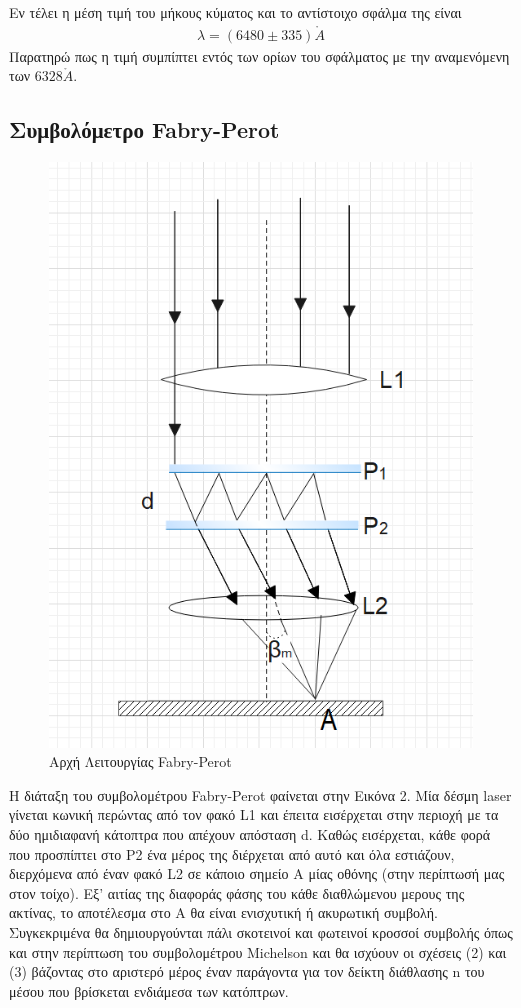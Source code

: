 \documentclass[a4paper]{article}
\begin{document}
Εν τέλει η μέση τιμή του μήκους κύματος και το αντίστοιχο σφάλμα της είναι
\begin{align*}
\lambda = ( 6480\pm 335) \mathring{A}
\end{align*}
Παρατηρώ πως η τιμή συμπίπτει εντός των ορίων του σφάλματος με την αναμενόμενη των $6328\mathring{A}$.


\subsection*{Συμβολόμετρο Fabry-Perot}

\begin{figure}
\includegraphics[width=0.7\linewidth]{fabry.png} 
\caption{ Αρχή Λειτουργίας Fabry-Perot}
\label{fig:wrapfig}
\end{figure}

Η διάταξη του συμβολομέτρου Fabry-Perot	 φαίνεται στην Εικόνα 2.
 Μία δέσμη laser γίνεται κωνική περώντας από τον φακό L1 και έπειτα εισέρχεται στην περιοχή με τα δύο ημιδιαφανή κάτοπτρα που απέχουν απόσταση d. Καθώς εισέρχεται, κάθε φορά που προσπίπτει στο Ρ2 ένα μέρος της διέρχεται από αυτό και όλα εστιάζουν, διερχόμενα από έναν φακό L2 σε κάποιο σημείο Α μίας οθόνης (στην περίπτωσή μας στον τοίχο).
Εξ' αιτίας της διαφοράς φάσης του κάθε διαθλώμενου μερους της ακτίνας, το αποτέλεσμα στο Α θα είναι ενισχυτική ή ακυρωτική συμβολή. Συγκεκριμένα θα δημιουργούνται πάλι σκοτεινοί και φωτεινοί κροσσοί συμβολής όπως και στην περίπτωση του συμβολομέτρου Michelson και θα ισχύουν οι σχέσεις (2) και (3) βάζοντας στο αριστερό μέρος έναν παράγοντα για τον δείκτη διάθλασης n του μέσου που βρίσκεται ενδιάμεσα των κατόπτρων.
\end{document}
